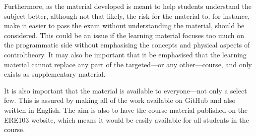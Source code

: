 Furthermore, as the material developed is meant to help students understand the subject better, although not that likely, the risk for the material to, for instance, make it easier to pass the exam without understanding the material, should be considered.
This could be an issue if the learning material focuses too much on the programmatic side without emphasising the concepts and physical aspects of \gls{controltheory}. It may also be important that it be emphasised that the learning material cannot replace any part of the targeted---or any other---course, and only exists as supplementary material.

It is also important that the material is available to everyone---not only a select few. This is assured by making all of the work available on GitHub and also written in English. The aim is also to have the course material published on the \gls{ERE103} website, which means it would be easily available for all students in the course.



\iffalse
Besides the utility of the project, it is not likely that this project would harm or impact society in any negative way as such. As stated earlier the content is very specifically to demystify mathematics and concepts therein for students of control theory. 
\fi



